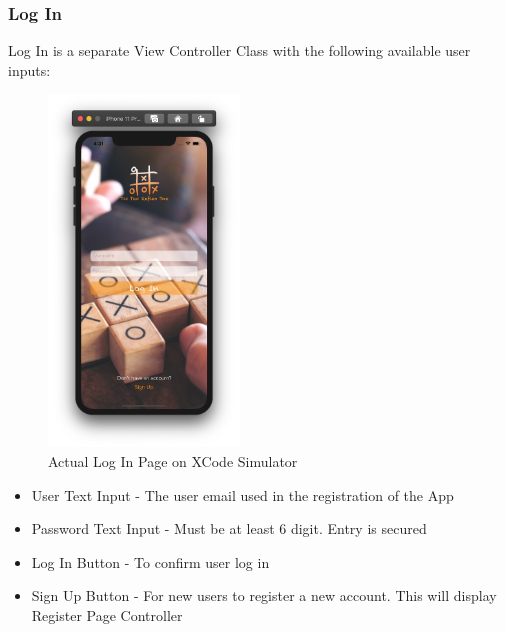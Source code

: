 \documentclass{article}
\begin{document}
    \subsubsection{Log In}
    Log In is a separate View Controller Class with the following available user inputs:
        \begin{figure}[h]
            \centering
            \includegraphics[width=2in]{images/sim_log.png}
        \caption{Actual Log In Page on XCode Simulator}
        \end{figure}
        \newline
        \begin{itemize}
            \item User Text Input - The user email used in the registration of the App
            \item Password Text Input - Must be at least 6 digit.  Entry is secured
            \item Log In Button - To confirm user log in
            \item Sign Up Button - For new users to register a new account.  This will display Register Page Controller
        \end{itemize}
        \newpage
\end{document}
